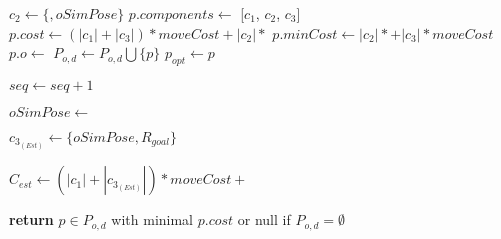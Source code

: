 \begin{algorithm}[H]
\begin{algorithmic}[1]
            \State $c_{2} \gets \{$$, oSimPose\}$
            \State {}
              \State $p.components \gets$ [$c_{1}$, $c_{2}$, $c_{3}$]
              \State $p.cost \gets (|c_{1}| + |c_{3}|) * moveCost + |c_{2}| * $
              \State $p.minCost \gets |c_{2}| * $$ + |c_{3}| * moveCost$
              \State $p.o \gets$  \label{lst:line:ovaraffec1} \label{lst:line:copy_note}
              \State {}
              \State {}
              \State {}
              \State $P_{o,d} \gets P_{o,d} \bigcup \{p\}$
                \State $p_{opt} \gets p$
              \EndIf \label{lst:line:ovaraffec2}
            \EndIf

          \State $seq \gets seq + 1$ \label{lst:line:loopvarup1}

          \State {}

          \State {} \label{lst:line:get_safe_swept_are_call_2}

          \State $oSimPose \gets $ \label{lst:line:loopvarup2}

          \State $c_{3_{(Est)}} \gets \{oSimPose, R_{goal}\}$

          \State $C_{est} \gets (|c_{1}| + |c_{3_{(Est)}}|) * moveCost + $

        \EndWhile

      \EndFor

    \State \textbf{return} $p \in P_{o,d}$ with minimal $p.cost$ or null if $P_{o,d} = \emptyset$

    \EndProcedure

  \end{algorithmic}
\end{algorithm}
